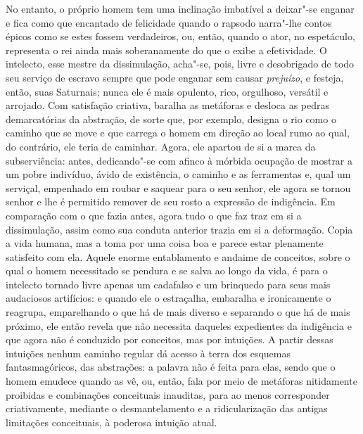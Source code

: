 No entanto, o próprio homem tem uma inclinação imbatível a deixar"-se
enganar e fica como que encantado de felicidade quando o rapsodo
narra"-lhe contos épicos como se estes fossem verdadeiros, ou, então,
quando o ator, no espetáculo, representa o rei ainda mais soberanamente
do que o exibe a efetividade. O intelecto, esse mestre da dissimulação,
acha"-se, pois, livre e desobrigado de todo seu serviço de escravo
sempre que pode enganar sem causar \textit{prejuízo}, e festeja, então,
suas Saturnais; nunca ele é mais opulento, rico, orgulhoso, versátil e
arrojado. Com satisfação criativa, baralha as metáforas e desloca
as pedras demarcatórias da abstração, de sorte que, por exemplo,
designa o rio como o caminho que se move e que carrega o homem em
direção ao local rumo ao qual, do contrário, ele teria de caminhar.
Agora, ele apartou de si a marca da subserviência: antes,
dedicando"-se com afinco à mórbida ocupação de mostrar a um pobre
indivíduo, ávido de existência, o caminho e as ferramentas e, qual um
serviçal, empenhado em roubar e saquear para o seu senhor, ele agora se
tornou senhor e lhe é permitido remover de seu rosto a expressão de indigência. Em
comparação com o que fazia antes, agora tudo o que faz traz em si a
dissimulação, assim como sua conduta anterior trazia em si a deformação.
Copia a vida humana, mas a toma por uma coisa boa e parece estar
plenamente satisfeito com ela. Aquele enorme entablamento e andaime
de conceitos, sobre o qual o homem necessitado se pendura e se salva ao
longo da vida, é para o intelecto tornado livre apenas um cadafalso e
um brinquedo para seus mais audaciosos artifícios: e quando ele o
estraçalha, 
embaralha e ironicamente o reagrupa, emparelhando o que há de
mais diverso e separando o que há de mais próximo, ele então revela que
não necessita daqueles expedientes da indigência e que agora não é
conduzido por conceitos, mas por intuições. A partir dessas intuições nenhum
caminho regular dá acesso à terra dos esquemas fantasmagóricos, das
abstrações: a palavra não é feita para elas, sendo que o homem emudece
quando as vê, ou, então, fala por meio de metáforas nitidamente
proibidas e combinações conceituais inauditas, para ao menos
corresponder criativamente, mediante o desmantelamento e a
ridicularização das antigas limitações conceituais, à poderosa intuição
atual.

